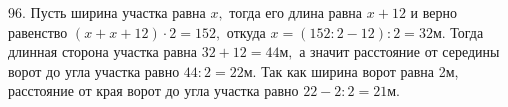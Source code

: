 96. Пусть ширина участка равна $x,$ тогда его длина равна $x+12$ и верно равенство $(x+x+12)\cdot2=152,$ откуда $x=(152:2-12):2=32\text{м}.$ Тогда длинная сторона участка равна $32+12=44\text{м},$ а значит расстояние от середины ворот до угла участка равно $44:2=22\text{м}.$ Так как ширина ворот равна 2м, расстояние от края ворот до угла участка равно $22-2:2=21\text{м}.$\\
